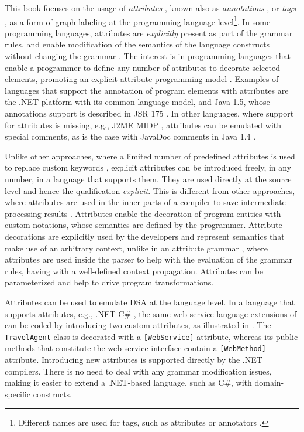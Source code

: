 This book focuses on the usage of \textit{attributes} \cite{www.dotnet}, known also as \textit{annotations} \cite{www.java.meta}, or \textit{tags} \cite{www.mof}, as a form of graph labeling \cite{term.rewrite,Plump.95,mens.99} at the programming language level\footnote{Different names are used for tags, such as attributes \cite{www.dotnet} or annotators \cite{www.java.meta}.}. In some programming languages, attributes are \textit{explicitly} present as part of the grammar rules, and enable modification of the semantics of the language constructs without changing the grammar \cite{Taha.1997}. The interest is in programming languages that enable a programmer to define any number of attributes to decorate selected elements, promoting an explicit attribute programming model \cite{java.explicit.programming}. Examples of languages that support the annotation of program elements with attributes are the .NET \cite{www.dotnet} platform with its common language model, and Java 1.5, whose annotations support is described in JSR 175 \cite{www.java.meta}. In other languages, where support for attributes is missing, e.g., J2ME MIDP \cite{www.midp-ota}, attributes can be emulated with special comments, as is the case with JavaDoc \cite{jw-pollac} comments in Java 1.4 .

Unlike other approaches, where a limited number of predefined attributes is used to replace custom keywords \cite{Taha.1997}, explicit attributes can be introduced freely, in any number, in a language that supports them. They are used directly at the source level and hence the qualification \textit{explicit}. This is different from other approaches, where attributes are used in the inner parts of a compiler to save intermediate processing results \cite{asfsdf.02,java.compilers.book}. Attributes enable the decoration of program entities with custom notations, whose semantics are defined by the programmer. Attribute decorations are explicitly used by the developers and represent semantics that make use of an arbitrary context, unlike in an attribute grammar \cite{attrib.gram,morr.02}, where attributes are used inside the parser to help with the evaluation of the grammar rules, having with a well-defined context propagation. Attributes can be parameterized  and help to drive program transformations. 


Attributes can be used to emulate DSA at the language level. In a language that supports attributes, e.g., .NET C\# \cite{www.dotnet}, the same web service language extensions of   can be coded by introducing two custom attributes, as illustrated in .
The \texttt{Travel\-Agent} class is decorated with a \texttt{[Web\-Servi\-ce]} attribute, whereas its public methods that constitute the web service interface contain a \texttt{[Web\-Me\-thod]} attribute. Introducing new attributes is supported directly by the .NET compilers. There is no need to deal with any grammar modification issues, making it easier to extend a .NET-based language, such as C\#, with domain-specific constructs.

